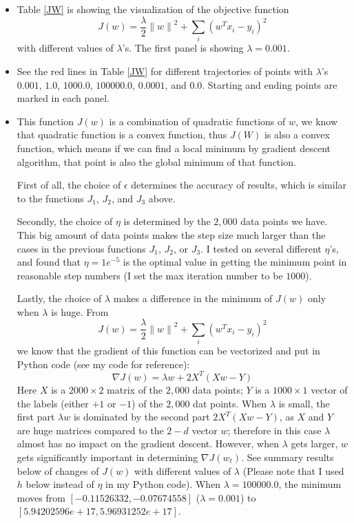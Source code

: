 \begin{itemize}
\item Table \ref{JW} is showing the visualization of the objective function 
\[
J(w)=\frac{\lambda}{2} {\|w\|}^2 + \sum_i (w^Tx_i-y_i)^2
\]
with different values of $\lambda$'s. The first panel is showing $\lambda=0.001$.


\item See the red lines in Table \ref{JW} for different trajectories of points with $\lambda$'s $0.001$, $1.0$, $1000.0$, $100000.0$, $0.0001$, and $0.0$. Starting and ending points are marked in each panel. 

\item This function $J(w)$ is a combination of quadratic functions of $w$, we know that quadratic function is a convex function, thus $J(W)$ is also a convex function, which means if we can find a local minimum by gradient descent algorithm, that point is also the global minimum of that function. 

First of all, the choice of $\epsilon$ determines the accuracy of results, which is similar to the functions $J_1$, $J_2$, and $J_3$ above. 

Secondly, the choice of $\eta$ is determined by the $2,000$ data points we have. This big amount of data points makes the step size much larger than the cases in the previous functions $J_1$, $J_2$, or $J_3$. I tested on several different $\eta$'s, and found that $\eta=1e^{-5}$ is the optimal value in getting the minimum point in reasonable step numbers (I set the max iteration number to be $1000$).

Lastly, the choice of $\lambda$ makes a difference in the minimum of $J(w)$ only when $\lambda$ is huge. From 
\[
J(w)=\frac{\lambda}{2} {\|w\|}^2 + \sum_i (w^Tx_i-y_i)^2
\]
we know that the gradient of this function can be vectorized and put in Python code (see my code for reference):
\[
\nabla J(w) = \lambda w + 2 X^T (Xw-Y)
\]
Here $X$ is a $2000\times 2$ matrix of the $2,000$ data points; $Y$ is a $1000\times 1$ vector of the labels (either $+1$ or $-1$) of the $2,000$ dat points. When $\lambda$ is small, the first part $\lambda w$ is dominated by the second part $2 X^T (Xw-Y)$, as $X$ and $Y$ are huge matrices compared to the $2-d$ vector $w$; therefore in this case $\lambda$ almost has no impact on the gradient descent. However, when $\lambda$ gets larger, $w$ gets significantly important in determining $\nabla J(w_t)$. See summary results below of changes of $J(w)$ with different values of $\lambda$ (Please note that I used $h$ below instead of $\eta$ in my Python code). When $\lambda=100000.0$, the minimum moves from $[-0.11526332,-0.07674558]$ ($\lambda=0.001$) to $[5.94202596e+17,5.96931252e+17]$. 


\end{itemize}

